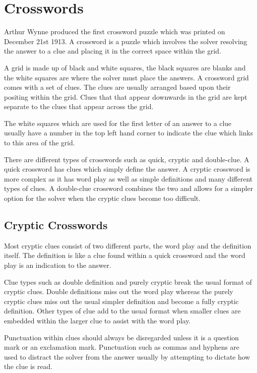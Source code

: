 \section{Crosswords}

Arthur Wynne produced the first crossword puzzle which was printed on December
21st 1913. A crossword is a puzzle which involves the solver resolving the
answer to a clue and placing it in the correct space within the grid. 

A grid is made up of black and white squares, the black squares are blanks and 
the white squares are where the solver must place the answers. A crossword grid 
comes with a set of clues. The clues are usually arranged based upon their 
positing within the grid. Clues that that appear downwards in the grid are kept 
separate to the clues that appear across the grid. 

The white squares which are used for the first letter of an answer to a clue 
usually have a number in the top left hand corner to indicate the clue which 
links to this area of the grid.

There are different types of crosswords such as quick, cryptic and double-clue.
A quick crossword has clues which simply define the answer. A cryptic crossword
is more complex as it has word play as well as simple definitions and many
different types of clues. A double-clue crossword combines the two and allows
for a simpler option for the solver when the cryptic clues become too difficult.


\subsection{Cryptic Crosswords} 

Most cryptic clues consist of two different parts, the word play and the
definition itself. The definition is like a clue found within a quick crossword
and the word play is an indication to the answer.

Clue types such as double definition and purely cryptic break the usual format
of cryptic clues. Double definitions miss out the word play whereas the purely
cryptic clues miss out the usual simpler definition and become a fully cryptic
definition. Other types of clue add to the usual format when smaller clues are
embedded within the larger clue to assist with the word play.

Punctuation within clues should always be disregarded unless it is a question
mark or an exclamation mark. Punctuation such as commas and hyphens are used to
distract the solver from the answer usually by attempting to dictate how the
clue is read.

